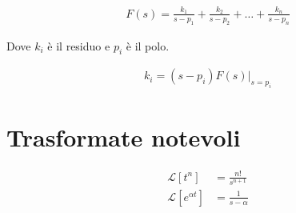 \begin{align}
  F(s) = \frac{k_1}{s- p_1} + \frac{k_2}{s- p_2} + \dots + \frac{k_n}{s- p_n}
\end{align}

Dove $k_i$ \`e il residuo e $p_i$ \`e il polo.

\begin{align}
  k_i = (s-p_i)F(s)\Big|_{s=p_i}
\end{align}

\section{Trasformate notevoli}

\begin{align}
  \mathcal{L}[t^n] &= \frac{n!}{s^{n+1}} \\
  \mathcal{L}[e^{\alpha t}] &= \frac{1}{s-\alpha}
\end{align}
